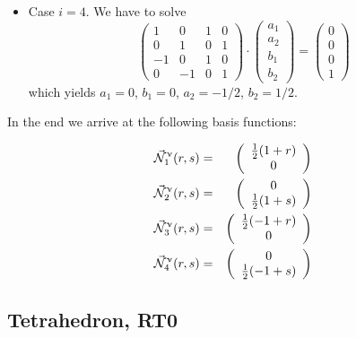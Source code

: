 \begin{itemize}
\item Case $i=4$. We have to solve
\[
\left(\begin{array}{cccc}
1 & 0 & 1 & 0 \\
0 & 1 & 0 & 1 \\
-1 & 0 & 1 & 0\\
0 & -1 & 0 & 1
\end{array}\right)
\cdot
\left(\begin{array}{c}
a_1 \\ a_2 \\ b_1 \\ b_2
\end{array}\right)
=
\left(\begin{array}{c}
0 \\ 0 \\ 0 \\ 1
\end{array}\right)
\]
which yields 
$a_1=0$, $b_1=0$, $a_2=-1/2$, $b_2=1/2$.

\end{itemize}

In the end we arrive at the following basis functions:

\begin{mdframed}[backgroundcolor=blue!5]
\begin{eqnarray}
\vec{{\mathcal{N}}}^\upnu_1 (r,s) &=& 
\left(\begin{array}{c} \frac12 (1+r) \\ 0 \end{array}\right) \nonumber\\
\vec{{\mathcal{N}}}^\upnu_2 (r,s) &=& 
\left(\begin{array}{c} 0 \\ \frac12 (1+s)  \end{array}\right) \nonumber\\
\vec{{\mathcal{N}}}^\upnu_3 (r,s) &=& 
\left(\begin{array}{c} \frac12 (-1+r) \\ 0 \end{array}\right) \nonumber\\
\vec{{\mathcal{N}}}^\upnu_4 (r,s) &=& 
\left(\begin{array}{c} 0 \\ \frac12 (-1+s)  \end{array}\right)
\end{eqnarray}
\end{mdframed}



\subsection{Tetrahedron, RT0}


